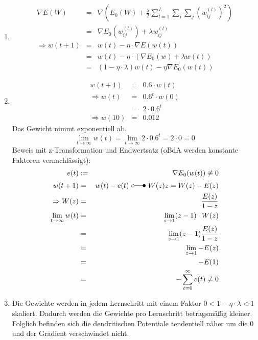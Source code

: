 \documentclass[DIN, pagenumber=false, fontsize=11pt, parskip=half]{scrartcl}
\begin{document}
    \subsection{}
    \begin{enumerate}[label=(\alph*)]
        \item
            \begin{eqnarray*}
                \nabla E(W) &=& \nabla \left( E_0(W) + \frac{\lambda}{2} \sum_{l=1}^L \sum_i \sum_j {\left( w_{ij}^{(l)} \right)}^2 \right)\\
                &=& \nabla E_0(w_{ij}^{(l)}) + \lambda w_{ij}^{(l)} \\
                \Rightarrow w(t+1) &=& w(t) - \eta \cdot \nabla E(w(t)) \\
                &=& w(t) - \eta \cdot \left(\nabla E_0(w) + \lambda w(t)\right) \\
                &=& (1- \eta \cdot \lambda) w(t) - \eta \nabla E_0 (w(t))
            \end{eqnarray*}

        \item
            \begin{eqnarray*}
                w(t+1) &=& 0.6 \cdot w(t) \\
                \Rightarrow w(t) &=& 0.6^t \cdot w(0) \\
                &=& 2 \cdot 0.6^t \\
                \Rightarrow w(10) &=& 0.012
            \end{eqnarray*}
            Das Gewicht nimmt exponentiell ab.
            \begin{equation*}
                \lim_{t \to \infty} w(t) = \lim_{t \to \infty} 2 \cdot 0.6^t = 2 \cdot 0 = 0
            \end{equation*}
            Beweis mit z-Transformation und Endwertsatz (oBdA werden konstante Faktoren vernachlässigt):
            \begin{eqnarray*}
                e(t) &:=& \nabla E_0(w(t)) \not\equiv 0\\
                w(t+1) &=& w(t) - e(t)\  \laplace\ W(z) z = W(z) - E(z)\\
                \Rightarrow W(z) &=& \frac{E(z)}{1-z} \\                
                \lim_{t \to \infty} w(t) &=& \lim_{z \to 1} (z-1) \cdot  W(z) \\
                &=& \lim_{z \to 1} (z-1) \frac{E(z)}{1-z} \\
                &=& \lim_{z \to 1} -E(z) \\
                &=& -E(1)  \\
                &=& -\sum_{t=0}^\infty e(t) \neq 0
            \end{eqnarray*}
        \item Die Gewichte werden in jedem Lernschritt mit einem Faktor $0 < 1 -\eta \cdot  \lambda < 1$ skaliert. Dadurch werden die Gewichte pro Lernschritt betragsmäßig kleiner. Folglich befinden sich die dendritischen Potentiale tendentiell näher um die $0$ und der Gradient verschwindet nicht.
    \end{enumerate}
\end{document}
